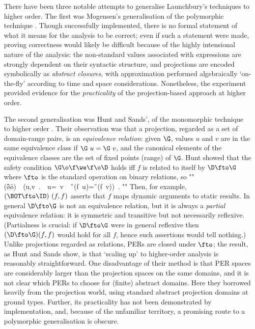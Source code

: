 \documentclass[11pt]{article}
\begin{document}
There have been three notable attempts to generalise Launchbury's
techniques to higher order.  The first was Mogensen's generalisation
of the polymorphic technique \cite{Mog89}.  Though successfully
implemented, there is no formal statement of what it means for the
analysis to be correct; even if such a statement were made, proving
correctness would likely be difficult because of the highly
intensional nature of the analysis: the non-standard values associated
with expressions are strongly dependent on their syntactic structure,
and projections are encoded symbolically as {\it abstract closures\/},
with approximation performed algebraically `on-the-fly' according to
time and space considerations.  Nonetheless, the experiment provided
evidence for the {\it practicality\/} of the projection-based approach
at higher order.

The second generalisation was Hunt and Sands', of the monomorphic
technique to higher order \cite{HS91}.  Their observation was that a
projection, regarded as a set of domain-range pairs, is an {\it
equivalence relation\/}: given $\G$, values $u$ and $v$ are in the
same equivalence class if $\G~u=\G~v$, and the canonical elements of
the equivalence classes are the set of fixed points (range) of $\G$.
Hunt showed that the safety condition $\G\o\f\we\f\o\D$ holds iff $f$
is related to itself by $\D\fto\G$ where $\fto$ is the standard
operation on binary relations, so 
"" 
	(\G\o\f\we\f\o\D)\
	\Leftrightarrow\ 
	(\forall u,v\ .\ \D\ u=\D\ v\ \Rightarrow\ \G\ (f\ u)=\G\ (f\ v))\ .  
""
Then, for example, $(\BOT\fto\ID)~(f,f)$ asserts
that $f$ maps dynamic arguments to static results.  In general
$\D\fto\G$ is not an equivalence relation, but it is always a {\it
partial\/} equivalence relation: it is symmetric and transitive but
not necessarily reflexive.  (Partialness is crucial: if $\D\fto\G$
were in general reflexive then $(\D\fto\G)(f,f)$ would hold for all
$f$, hence such assertions would tell nothing.)  Unlike projections
regarded as relations, PERs are closed under $\fto$; the result, as
Hunt and Sands show, is that `scaling up' to higher-order analysis is
reasonably straightforward.  One disadvantage of their method is that
PER spaces are considerably larger than the projection spaces on the
same domains, and it is not clear which PERs to choose for (finite)
abstract domains.  Here they borrowed heavily from the projection
world, using standard abstract projection domains at ground types.
Further, its practicality has not been demonstrated by implementation,
and, because of the unfamiliar territory, a promising route to a
polymorphic generalisation is obscure.
\end{document}
